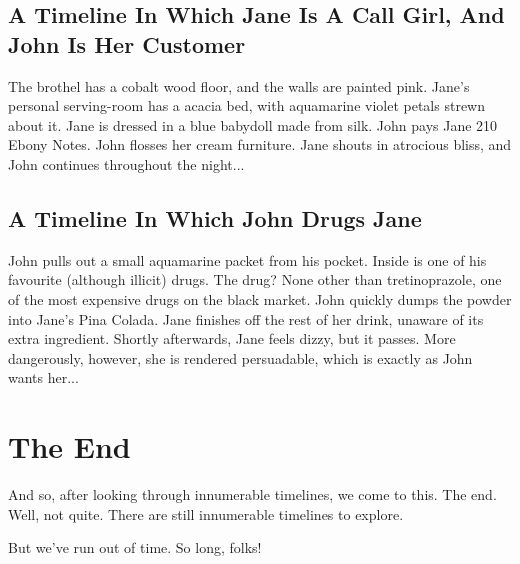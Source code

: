 \documentclass{article}
\begin{document}
\subsection{A Timeline In Which Jane Is A Call Girl, And John Is Her Customer}


The brothel has a cobalt wood floor, and the walls are painted pink.
Jane's personal serving{-}room has a acacia bed, with aquamarine violet petals strewn about it.
Jane is dressed in a blue babydoll made from silk.
John pays Jane 210 Ebony Notes.
John flosses her cream furniture.
Jane shouts in atrocious bliss, and John continues throughout the night...
\subsection{A Timeline In Which John Drugs Jane}


John pulls out a small aquamarine packet from his pocket. Inside is one of his favourite (although illicit) drugs.
The drug? None other than tretinoprazole, one of the most expensive drugs on the black market.
John quickly dumps the powder into Jane's Pina Colada.
Jane finishes off the rest of her drink, unaware of its extra ingredient.
Shortly afterwards, Jane feels dizzy, but it passes.
More dangerously, however, she is rendered persuadable, which is exactly as John wants her...
\section{The End}
And so, after looking through innumerable timelines, we come to this.
 The end.
 Well, not quite.
There are still innumerable timelines to explore.


But we've run out of time.
So long, folks!
\end{document}
